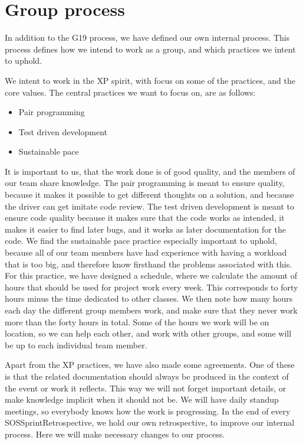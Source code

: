 \section{Group process}

In addition to the \gls{G19} process, we have defined our own internal process.
This process defines how we intend to work as a group, and which practices we intent to uphold. 

We intent to work in the \gls{XP} spirit, with focus on some of the practices, and the core values.
The central practices we want to focus on, are as follows:
\begin{itemize}
    \item Pair programming 
    \item Test driven development
    \item Sustainable pace
\end{itemize}

It is important to us, that the work done is of good quality, and the members of our team share knowledge. The pair programming is meant to ensure quality, because it makes it possible to get different thoughts on a solution, and because the \gls{driver} can get imitate code review.
The test driven development is meant to ensure code quality because it makes sure that the code works as intended, it makes it easier to find later bugs, and it works as later documentation for the code. 
We find the sustainable pace practice especially important to uphold, because all of our team members have had experience with having a workload that is too big, and therefore know firsthand the problems associated with this. 
For this practice, we have designed a schedule, where we calculate the amount of hours that should be used for project work every week. This corresponds to forty hours minus the time dedicated to other classes. We then note how many hours each day the different group members work, and make sure that they never work more than the forty hours in total. Some of the hours we work will be on location, so we can help each other, and work with other groups, and some will be up to each individual team member.

Apart from the \gls{XP} practices, we have also made some agreements. 
One of these is that the related documentation should always be produced in the context of the event or work it reflects. This way we will not forget important details, or make knowledge implicit when it should not be. 
We will have daily standup meetings, so everybody knows how the work is progressing. 
In the end of every \gls{SOSSprintRetrospective}, we hold our own retrospective, to improve our internal process. Here we will make necessary changes to our process. 
